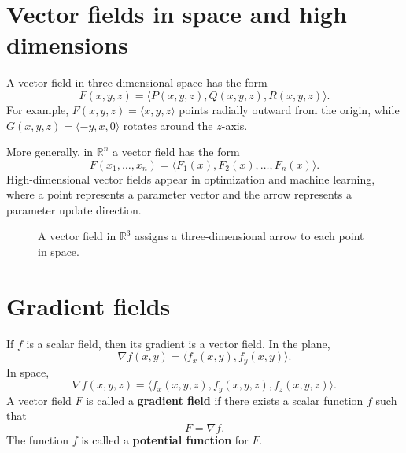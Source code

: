 \documentclass[11pt]{article}
\newcommand{\R}{\mathbb R}
\newcommand{\grad}{\nabla}
\begin{document}
\section{Vector fields in space and high dimensions}

A vector field in three-dimensional space has the form
\[
F(x,y,z)=\langle P(x,y,z),Q(x,y,z),R(x,y,z)\rangle.
\]
For example, $F(x,y,z)=\langle x,y,z\rangle$ points radially outward from the origin, while $G(x,y,z)=\langle -y,x,0\rangle$ rotates around the $z$-axis.

More generally, in $\R^n$ a vector field has the form
\[
F(x_1,\ldots,x_n)=\langle F_1(x),F_2(x),\ldots,F_n(x)\rangle.
\]
High-dimensional vector fields appear in optimization and machine learning, where a point represents a parameter vector and the arrow represents a parameter update direction.

\begin{figure}[H]
\centering
{}
\caption{A vector field in $\R^3$ assigns a three-dimensional arrow to each point in space.}
\end{figure}

\section{Gradient fields}

If $f$ is a scalar field, then its gradient is a vector field. In the plane,
\[
\grad f(x,y)=\langle f_x(x,y),f_y(x,y)\rangle.
\]
In space,
\[
\grad f(x,y,z)=\langle f_x(x,y,z),f_y(x,y,z),f_z(x,y,z)\rangle.
\]
A vector field $F$ is called a \textbf{gradient field} if there exists a scalar function $f$ such that
\[
F=\grad f.
\]
The function $f$ is called a \textbf{potential function} for $F$.
\end{document}
